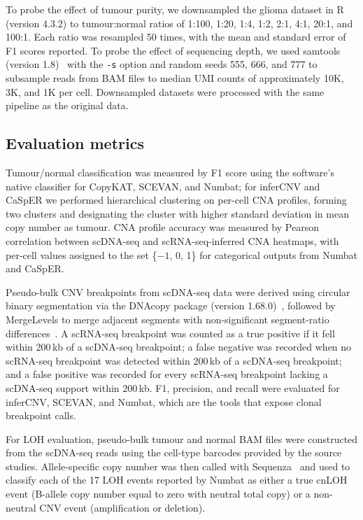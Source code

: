 \documentclass[11pt]{article}
\begin{document}
To probe the effect of tumour purity, we downsampled the glioma dataset in R
(version 4.3.2) to tumour:normal ratios of 1:100, 1:20, 1:4, 1:2, 2:1, 4:1,
20:1, and 100:1. Each ratio was resampled 50 times, with the mean and
standard error of F1 scores reported. To probe the effect of sequencing
depth, we used samtools (version 1.8)~\cite{li2009samtools} with the
\texttt{-s} option and random seeds 555, 666, and 777 to subsample reads
from BAM files to median UMI counts of approximately 10K, 3K, and 1K per
cell. Downsampled datasets were processed with the same pipeline as the
original data.

\subsection{Evaluation metrics}

Tumour/normal classification was measured by F1 score using the software's
native classifier for CopyKAT, SCEVAN, and Numbat; for inferCNV and CaSpER we
performed hierarchical clustering on per-cell CNA profiles, forming two
clusters and designating the cluster with higher standard deviation in mean
copy number as tumour. CNA profile accuracy was measured by Pearson
correlation between scDNA-seq and scRNA-seq-inferred CNA heatmaps, with
per-cell values assigned to the set \{$-1$, 0, 1\} for categorical outputs
from Numbat and CaSpER.

Pseudo-bulk CNV breakpoints from scDNA-seq data were derived using circular
binary segmentation via the DNAcopy package (version
1.68.0)~\cite{olshen2004dnacopy}, followed by MergeLevels to merge adjacent
segments with non-significant segment-ratio
differences~\cite{willenbrock2005comparison}. A scRNA-seq breakpoint was
counted as a true positive if it fell within 200\,kb of a scDNA-seq
breakpoint; a false negative was recorded when no scRNA-seq breakpoint was
detected within 200\,kb of a scDNA-seq breakpoint; and a false positive was
recorded for every scRNA-seq breakpoint lacking a scDNA-seq support within
200\,kb. F1, precision, and recall were evaluated for inferCNV, SCEVAN, and
Numbat, which are the tools that expose clonal breakpoint calls.

For LOH evaluation, pseudo-bulk tumour and normal BAM files were constructed
from the scDNA-seq reads using the cell-type barcodes provided by the
source studies. Allele-specific copy number was then called with
Sequenza~\cite{favero2015sequenza} and used to classify each of the 17 LOH
events reported by Numbat as either a true cnLOH event (B-allele copy number
equal to zero with neutral total copy) or a non-neutral CNV event
(amplification or deletion).
\end{document}

